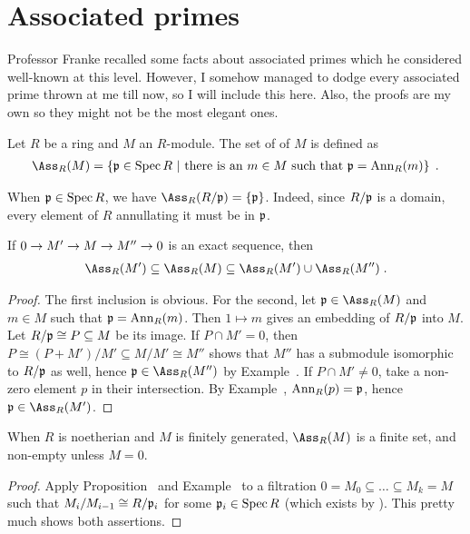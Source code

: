 \documentclass[a4paper,parskip=half,numbers=enddot, DIV=12]{scrreprt}
\begin{document}
\section{Associated primes}
Professor Franke recalled some facts about associated primes which he considered well-known at this level. However, I somehow managed to dodge every associated prime thrown at me till now, so I will include this here. Also, the proofs are my own so they might not be the most elegant ones.
\begin{defi}
	Let $R$ be a ring and $M$ an $R$-module. The set of  of $M$ is defined as
	\begin{align*}
		\Ass_R(M)=\left\{\pp\in\Spec R\st\text{there is an }m\in M\text{ such that }\pp=\Ann_R(m)\right\}\;.
	\end{align*}
\end{defi}
\begin{example}
	When $\mathfrak{p}\in\operatorname{Spec} R$, we have $\Ass_R(R/\pp)=\left\{\pp\right\}$. Indeed, since $R/\mathfrak{p}$ is a domain, every element of $R$ annullating it must be in $\mathfrak{p}$.
\end{example}
\begin{prop}
	If $0\morphism M'\morphism M\morphism M''\morphism 0$ is an exact sequence, then
	\begin{align*}
		\Ass_R(M')\subseteq \Ass_R(M)\subseteq \Ass_R(M')\cup\Ass_R(M'')\;.
	\end{align*}
\end{prop}
\begin{proof}
	The first inclusion is obvious. For the second, let $\pp\in\Ass_R(M)$ and $m\in M$ such that $\mathfrak{p}=\operatorname{Ann}_R(m)$. Then $1\mapsto m$ gives an embedding of $R/\mathfrak{p}$ into $M$. Let $R/\mathfrak{p}\cong P\subseteq M$ be its image. If $P\cap M'=0$, then $P\cong (P+M')/M'\subseteq M/M'\cong M''$ shows that $M''$ has a submodule isomorphic to $R/\mathfrak{p}$ as well, hence $\pp\in\Ass_R(M'')$ by Example~. If $P\cap M'\neq 0$, take a non-zero element $p$ in their intersection. By Example~, $\operatorname{Ann}_R(p)=\mathfrak{p}$, hence $\pp\in\Ass_R(M')$.
\end{proof}
\begin{cor}
	When $R$ is noetherian and $M$ is finitely generated, $\Ass_R(M)$ is a finite set, and non-empty unless $M=0$.
\end{cor}
\begin{proof}
	Apply Proposition~ and Example~ to a filtration $0=M_0\subseteq\ldots\subseteq M_k=M$ such that $M_i/M_{i-1}\cong R/\mathfrak{p}_i$ for some $\mathfrak{p}_i\in\operatorname{Spec} R$ (which exists by \cite[Proposition~3.1.2]{alg2}). This pretty much shows both assertions.
\end{proof}
\end{document}
